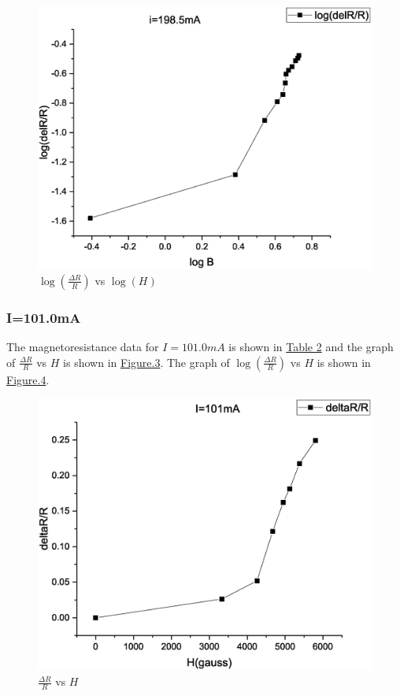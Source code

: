             \begin{figure}[]
                \centering
                \includegraphics[width=0.95\columnwidth]{images/Graph2.eps}
                \caption{$\log (\frac{\Delta R}{R})$  vs $\log(H)$}
                \label{fig:graph2}
            \end{figure}


        \subsubsection{I=101.0mA}
            The magnetoresistance data for $I=101.0mA$ is shown in \hyperref[tab:mag2]{Table 2} and the graph of $\frac{\Delta R}{R}$ vs $H$ is shown in \hyperref[fig:graph3]{Figure.3}. The graph of $\log(\frac{\Delta R}{R})$ vs $H$ is shown in \hyperref[fig:graph4]{Figure.4}.
            
            \begin{figure}[]
                \centering
                \includegraphics[width=0.95\columnwidth]{images/Graph3.eps}
                \caption{$\frac{\Delta R}{R}$ vs $H$}
                \label{fig:graph3}
            \end{figure}


